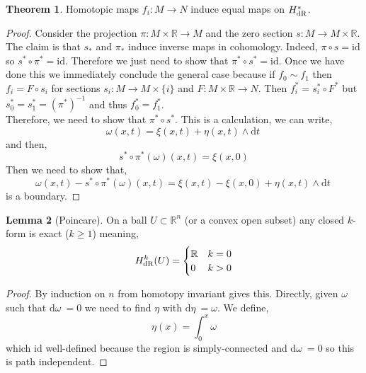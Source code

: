 \documentclass[12pt]{extarticle}
\newcommand{\R}{\mathbb{R}}
\newcommand{\id}{\mathrm{id}}
\renewcommand{\d}[1]{ \mathrm{d}#1 \:}
\theoremstyle{definition}
\newtheorem{theorem}{Theorem}[section]
\newtheorem{lemma}[theorem]{Lemma}
\begin{document}
\begin{theorem}
Homotopic maps $f_i : M \to N$ induce equal maps on $H_{\mathrm{dR}}^*$.
\end{theorem}

\begin{proof}
Consider the projection $\pi : M \times \R \to M$ and the zero section $s : M \to M \times \R$. The claim is that $s_*$ and $\pi_*$ induce inverse maps in cohomology. Indeed, $\pi \circ s = \id$ so $s^* \circ \pi^* = \id$. Therefore we just need to show that $\pi^* \circ s^* = \id$. Once we have done this we immediately conclude the general case because if $f_0 \sim f_1$ then $f_i = F \circ s_i$ for sections $s_i : M \to M \times \{ i \}$ and $F : M \times \R \to N$. Then $f_i^* = s_i^* \circ F^*$ but $s_0^* = s_1^* = (\pi^*)^{-1}$ and thus $f_0^* = f_1^*$.
\bigskip\\
Therefore, we need to show that $\pi^* \circ s^*$. This is a calculation, we can write,
\[ \omega(x,t) = \xi(x,t) + \eta(x,t) \wedge \d{t} \]
and then,
\[ s^* \circ \pi^* (\omega)(x,t) = \xi(x,0) \]
Then we need to show that,
\[ \omega(x,t) - s^* \circ \pi^* (\omega)(x,t) = \xi(x,t) - \xi(x,0) + \eta(x,t) \wedge \d{t} \]
is a boundary. 
\end{proof}

\begin{lemma}[Poincare]
On a ball $U \subset \R^n$ (or a convex open subset) any closed $k$-form is exact ($k \ge 1$) meaning,
\[ H^k_{\dR}(U) = 
\begin{cases}
\R & k = 0
\\
0 & k > 0 
\end{cases}\]
\end{lemma}

\begin{proof}
By induction on $n$ from homotopy invariant gives this. Directly, given $\omega$ such that $\d{\omega} = 0$ we need to find $\eta$ with $\d{\eta} = \omega$. We define,
\[ \eta(x) = \int_0^x \omega \]
which id well-defined because the region is simply-connected and $\d{\omega} = 0$ so this is path independent. 
\end{proof}
\end{document}
